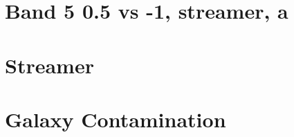\section{Band 5 0.5 vs -1, streamer, a}
\label{sec: discussion_band5_data_issues}


\section{Streamer}
\label{chap: discussion_streamer}







\section{Galaxy Contamination}






